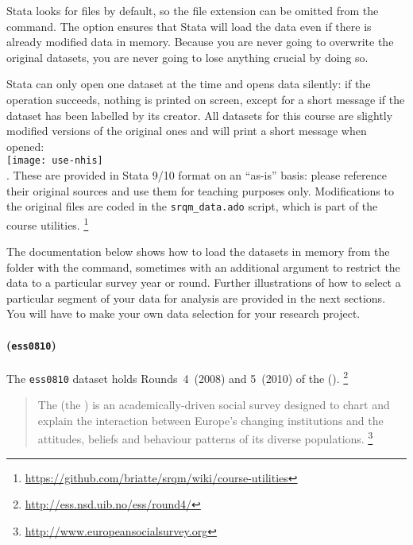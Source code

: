   Stata looks for  files by default, so the file extension can be omitted from the command. The  option ensures that Stata will load the data even if there is already modified data in memory. Because you are never going to overwrite the original datasets, you are never going to lose anything crucial by doing so.%

	Stata can only open one dataset at the time and opens data silently: if the operation succeeds, nothing is printed on screen, except for a short message if the dataset has been labelled by its creator. All datasets for this course are slightly modified versions of the original ones and will print a short message when opened:\\[1em]%
		
		\texttt{[image: use-nhis]}\\[1em]%

  . These are provided in Stata 9/10  format on an ``as-is'' basis: please reference their original sources and use them for teaching purposes only. Modifications to the original files are coded in the \texttt{srqm\_data.ado} script, which is part of the course utilities.%
    \footnote{\url{https://github.com/briatte/srqm/wiki/course-utilities}}%
    
  The documentation below shows how to load the datasets in memory from the \SRQM folder with the  command, sometimes with an additional  argument to restrict the data to a particular survey year or round. Further illustrations of how to select a particular segment of your data for analysis are provided in the next sections. You will have to make your own data selection for your research project.%

\paragraph{\ess (\texttt{ess0810})}

The \texttt{ess0810} dataset holds Rounds~4~(2008) and 5~(2010) of the \ess (\ESS).%
	\footnote{\url{http://ess.nsd.uib.no/ess/round4/}}

\begin{quote}
	The \ess (the \ESS) is an academically-driven social survey designed to chart and explain the interaction between Europe's changing institutions and the attitudes, beliefs and behaviour patterns of its diverse populations.%
	\footnote{\url{http://www.europeansocialsurvey.org}}
\end{quote}

